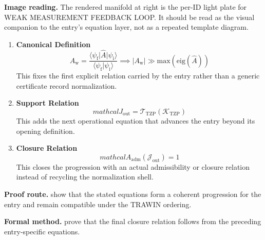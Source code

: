 \begin{samepage}
\noindent\begin{minipage}[t]{0.45\linewidth}
\vspace{0pt}
\raggedright
\scriptsize\textbf{Image reading.} The rendered manifold at right is the per-ID light plate for WEAK MEASUREMENT FEEDBACK LOOP. It should be read as the visual companion to the entry's equation layer, not as a repeated template diagram.\par
\end{minipage}\hfill
\begin{minipage}[t]{0.53\linewidth}
\vspace*{-0.10in}
\raggedright
{}
\end{minipage}
\end{samepage}

\clearpage


\begin{enumerate}[leftmargin=1.6em,itemsep=9pt,topsep=6pt]
\item \textbf{Canonical Definition}
\[
A_{\mathrm{w}} = \frac{\langle \psi_{\mathrm{f}} | \hat{A} \lvert \psi_{\mathrm{i}} \rangle}{\langle \psi_{\mathrm{f}} \lvert \psi_{\mathrm{i}} \rangle} \implies |A_{\mathrm{w}}| \gg \text{max}(\text{eig}(\hat{A}))
\]
This fixes the first explicit relation carried by the entry rather than a generic certificate record normalization.

\item \textbf{Support Relation}
\[
mathcal{J}_{\mathrm{out}} = \mathcal{T}_{\mathrm{TZP}}\!\left(\mathcal{K}_{\mathrm{TZP}}\right)
\]
This adds the next operational equation that advances the entry beyond its opening definition.

\item \textbf{Closure Relation}
\[
mathcal{A}_{\mathrm{adm}}\!\left(\mathcal{J}_{\mathrm{out}}\right)=1
\]
This closes the progression with an actual admissibility or closure relation instead of recycling the normalization shell.
\end{enumerate}

\textbf{Proof route.} show that the stated equations form a coherent progression for the entry and remain compatible under the TRAWIN ordering.

\textbf{Formal method.} prove that the final closure relation follows from the preceding entry-specific equations.

